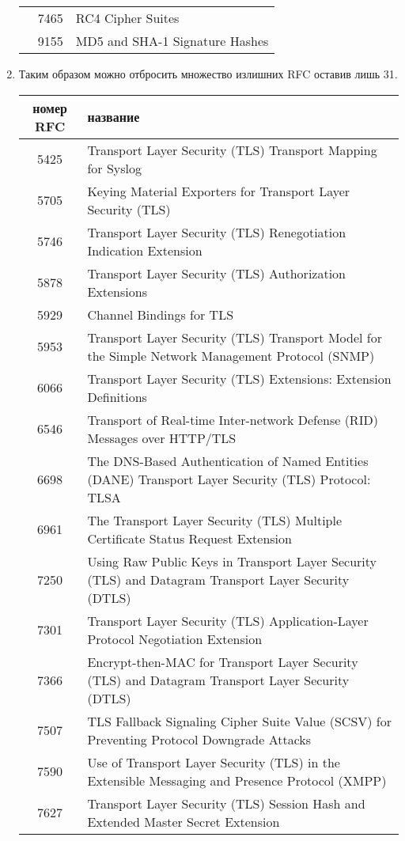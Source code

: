 \begin{enumerate}
\begin{tabular}{|c|c|l|}
		 & 7465 & RC4 Cipher Suites\\
		 & 9155	& MD5 and SHA-1 Signature Hashes\\
		\hline
	\end{tabular} 	

	\item Таким образом можно отбросить множество излишних RFC оставив лишь 31. 
	
	\tiny
	\begin{tabular}{|c|l|}
		\hline
		\textbf{номер RFC} & \textbf{название}\\
		\hline

		5425	&		Transport Layer Security (TLS) Transport Mapping for Syslog\\
		5705	&		Keying Material Exporters for Transport Layer Security (TLS)\\
		5746 	&		Transport Layer Security (TLS) Renegotiation Indication Extension\\
		5878 	&		Transport Layer Security (TLS) Authorization Extensions\\
		5929	&		Channel Bindings for TLS\\
		5953	&		Transport Layer Security (TLS) Transport Model for the Simple Network Management Protocol (SNMP)\\
		6066	&		Transport Layer Security (TLS) Extensions: Extension Definitions\\
		6546 	&		Transport of Real-time Inter-network Defense (RID) Messages over HTTP/TLS\\
		6698	&		The DNS-Based Authentication of Named Entities (DANE) Transport Layer Security (TLS) Protocol: TLSA\\
		6961	&		The Transport Layer Security (TLS) Multiple Certificate Status Request Extension\\
		7250 	&		Using Raw Public Keys in Transport Layer Security (TLS) and Datagram Transport Layer Security (DTLS)\\
		7301	&		Transport Layer Security (TLS) Application-Layer Protocol Negotiation Extension\\
		7366 	&		Encrypt-then-MAC for Transport Layer Security (TLS) and Datagram Transport Layer Security (DTLS)\\
		7507	&		TLS Fallback Signaling Cipher Suite Value (SCSV) for Preventing Protocol Downgrade Attacks\\
		7590	&		Use of Transport Layer Security (TLS) in the Extensible Messaging and Presence Protocol (XMPP)\\
		7627 	&		Transport Layer Security (TLS) Session Hash and Extended Master Secret Extension\\

\end{tabular}
\end{enumerate}
